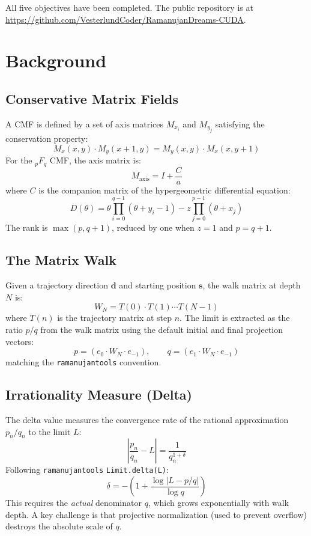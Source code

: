 \documentclass[11pt,a4paper]{article}
\begin{document}
All five objectives have been completed. The public repository is at
\url{https://github.com/VesterlundCoder/RamanujanDreams-CUDA}.

\section{Background}

\subsection{Conservative Matrix Fields}

A CMF is defined by a set of axis matrices $M_{x_i}$ and $M_{y_j}$
satisfying the conservation property:
\[
M_x(x, y) \cdot M_y(x+1, y) = M_y(x, y) \cdot M_x(x, y+1)
\]
For the ${}_pF_q$ CMF, the axis matrix is:
\[
M_{\text{axis}} = I + \frac{C}{a}
\]
where $C$ is the companion matrix of the hypergeometric differential equation:
\[
D(\theta) = \theta \prod_{i=0}^{q-1}(\theta + y_i - 1) - z \prod_{j=0}^{p-1}(\theta + x_j)
\]
The rank is $\max(p, q+1)$, reduced by one when $z=1$ and $p = q+1$.

\subsection{The Matrix Walk}

Given a trajectory direction $\mathbf{d}$ and starting position $\mathbf{s}$,
the walk matrix at depth $N$ is:
\[
W_N = T(0) \cdot T(1) \cdots T(N-1)
\]
where $T(n)$ is the trajectory matrix at step $n$. The limit is extracted as
the ratio $p/q$ from the walk matrix using the default initial and final
projection vectors:
\[
p = (e_0 \cdot W_N \cdot e_{-1}), \qquad q = (e_1 \cdot W_N \cdot e_{-1})
\]
matching the \texttt{ramanujantools} convention.

\subsection{Irrationality Measure (Delta)}

The delta value measures the convergence rate of the rational approximation
$p_n/q_n$ to the limit $L$:
\[
\left|\frac{p_n}{q_n} - L\right| = \frac{1}{q_n^{1+\delta}}
\]
Following \texttt{ramanujantools} \texttt{Limit.delta(L)}:
\[
\delta = -\left(1 + \frac{\log|L - p/q|}{\log q}\right)
\]
This requires the \emph{actual} denominator $q$, which grows exponentially
with walk depth. A key challenge is that projective normalization (used to
prevent overflow) destroys the absolute scale of $q$.
\end{document}
